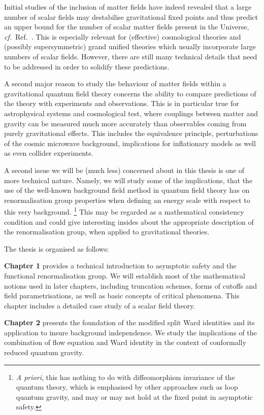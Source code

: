 \documentclass[11pt]{book}
\newcommand\cf{\textit{cf.}\ }
\numberwithin{equation}{chapter}
\begin{document}
Initial studies of the inclusion of matter fields have indeed revealed that
a large number of scalar fields may destabilise gravitational fixed points
and thus predict an upper bound for the number of scalar matter fields
present in the Universe, \cf Ref.~\cite{Dona:2013qba}. This is especially relevant
for (effective) cosmological theories and (possibly supersymmetric) grand unified
theories which usually incorporate large numbers of scalar fields.
However, there are still many technical details that need to be addressed
in order to solidify these predictions.

A second major reason to study the behaviour of matter fields within a gravitational
quantum field theory concerns the ability to compare predictions of the theory
with experiments and observations. This is in particular true for astrophysical
systems and cosmological test, where couplings between matter and gravity can
be measured much more accurately than observables coming from purely gravitational
effects. This includes the equivalence principle, perturbations of the
cosmic microwave background, implications for inflationary models as well as
even collider experiments.

A second issue we will be (much less) concerned about in this thesis is one of
more technical nature. Namely, we will study some of the implications, that the use
of the well-known background field method in quantum field theory has on renormalisation
group properties when defining an energy scale with respect to this very background.%
\footnote{%
  \textit{A priori}, this has nothing to do with diffeomorphism invariance of
  the quantum theory, which is emphasised by other approaches such as loop quantum gravity,
  and may or may not hold at the fixed point in asymptotic safety.
}
This may be regarded as a mathematical consistency condition and could give
interesting insides about the appropriate description of the renormalisation group,
when applied to gravitational theories.

\bigskip
\noindent
The thesis is organised as follows:

\medskip
\textbf{Chapter 1} provides a technical introduction to asymptotic safety and the
functional renormalisation group. We will establish most of the mathematical notions
used in later chapters, including truncation schemes, forms of cutoffs and field
parametrisations, as well as basic concepts of critical phenomena. This chapter includes
a detailed case study of a scalar field theory.

\medskip
\textbf{Chapter 2} presents the foundation of the modified split Ward identities and
its application to insure background independence. We study the implications of the
combination of flow equation and Ward identity in the context of conformally reduced
quantum gravity.
\end{document}
